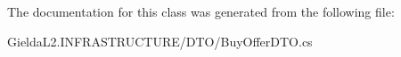 The documentation for this class was generated from the following file\+:\begin{DoxyCompactItemize}
\item 
Gielda\+L2.\+I\+N\+F\+R\+A\+S\+T\+R\+U\+C\+T\+U\+R\+E/\+D\+T\+O/Buy\+Offer\+D\+T\+O.\+cs\end{DoxyCompactItemize}
